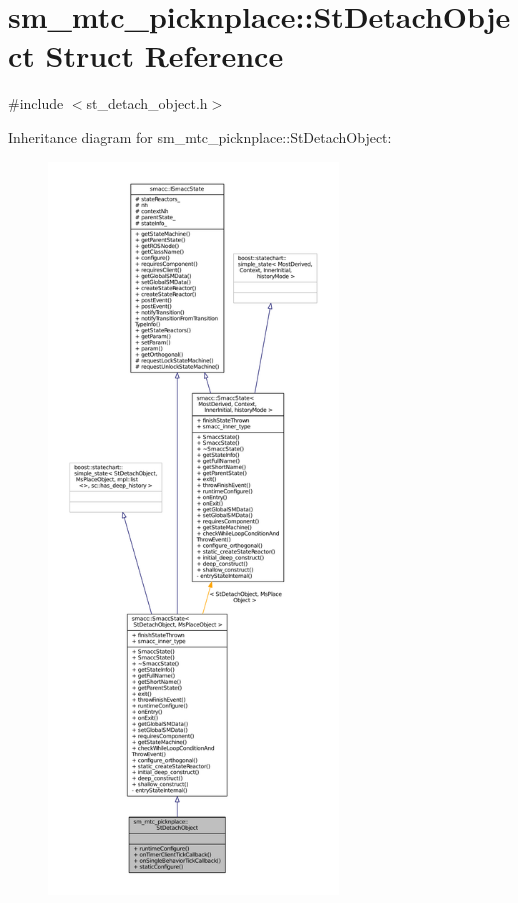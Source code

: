\hypertarget{structsm__mtc__picknplace_1_1StDetachObject}{}\section{sm\+\_\+mtc\+\_\+picknplace\+:\+:St\+Detach\+Object Struct Reference}
\label{structsm__mtc__picknplace_1_1StDetachObject}


{\ttfamily \#include $<$st\+\_\+detach\+\_\+object.\+h$>$}



Inheritance diagram for sm\+\_\+mtc\+\_\+picknplace\+:\+:St\+Detach\+Object\+:
\nopagebreak
\begin{figure}[H]
\begin{center}
\leavevmode
\includegraphics[height=550pt]{structsm__mtc__picknplace_1_1StDetachObject__inherit__graph}
\end{center}
\end{figure}


